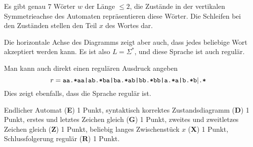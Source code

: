 \begin{loesung}
\begin{center}
\end{center}
Es gibt genau $7$ Wörter $w$ der Länge $\le 2$, die Zustände in der
vertikalen Symmetrieachse des Automaten repräsentieren diese Wörter.
Die Schleifen bei den Zuständen stellen den Teil $x$ des Wortes dar.

Die horizontale Achse des Diagramms zeigt aber auch, dass jedes beliebige
Wort akzeptiert werden kann.
Es ist also $L=\Sigma^*$, und diese Sprache ist auch regulär.

Man kann auch direkt einen regulären Ausdruck angeben
\[
\def\x{\texttt{.*}}
r=
\texttt{aa}\x\texttt{aa|ab}\x\texttt{ba|ba}\x\texttt{ab|bb}\x\texttt{bb|a}\x\texttt{a|b}\x\texttt{b}|\x
\]
Dies zeigt ebenfalls, dass die Sprache regulär ist.
\end{loesung}

\begin{bewertung}
Endlicher Automat ({\bf E}) 1 Punkt,
syntaktisch korrektes Zustandsdiagramm ({\bf D}) 1 Punkt,
erstes und letztes Zeichen gleich ({\bf G}) 1 Punkt,
zweites und zweitletzes Zeichen gleich ({\bf Z}) 1 Punkt,
beliebig langes Zwischenstück $x$ ({\bf X}) 1 Punkt,
Schlussfolgerung regulär ({\bf R}) 1 Punkt.
\end{bewertung}
